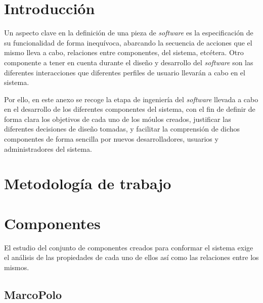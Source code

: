 \documentclass{article}
\title{\hmwkTitle}
\author{\textbf{\hmwkAuthorName}}
\date{1 de mayo de 2015}
\begin{document}
\maketitle


\setcounter{tocdepth}{1}

\newpage
\tableofcontents
\newpage

\section{Introducción}

Un aspecto clave en la definición de una pieza de \textit{software} es la especificación de su funcionalidad de forma inequívoca, abarcando la secuencia de acciones que el mismo lleva a cabo, relaciones entre componentes, del sistema, etcétera. Otro componente a tener en cuenta durante el diseño y desarrollo del \textit{software} son las diferentes interacciones que diferentes perfiles de usuario llevarán a cabo en el sistema.

Por ello, en este anexo se recoge la etapa de ingeniería del \textit{software} llevada a cabo en el desarrollo de los diferentes componentes del sistema, con el fin de definir de forma clara los objetivos de cada uno de los móulos creados, justificar las diferentes decisiones de diseño tomadas, y facilitar la comprensión de dichos componentes de forma sencilla por nuevos desarrolladores, usuarios y administradores del sistema.


\section{Metodología de trabajo}

\section{Componentes}

El estudio del conjunto de componentes creados para conformar el sistema exige el análisis de las propiedades de cada uno de ellos así como las relaciones entre los mismos.

\subsection{MarcoPolo}
\end{document}
